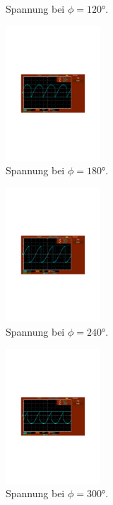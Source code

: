 \begin{figure}
\begin{subfigure}{0.48\textwidth}
      \caption{Spannung bei $\phi = 120°$.}
      \label{fig:ohne_120}
  \end{subfigure}
\hfill 
  \begin{subfigure}{0.48\textwidth}
      \centering
      \includegraphics[height=5cm]{content/abbildungen/ohne/180.pdf}
      \caption{Spannung bei $\phi = 180°$.}
      \label{fig:ohne_180}
  \end{subfigure}
\hfill 
  \begin{subfigure}{0.48\textwidth}
      \centering
      \includegraphics[height=5cm]{content/abbildungen/ohne/240.pdf}
      \caption{Spannung bei $\phi = 240°$.}
      \label{fig:ohne_240}
  \end{subfigure}
\hfill 
  \begin{subfigure}{0.48\textwidth}
      \centering
      \includegraphics[height=5cm]{content/abbildungen/ohne/300.pdf}
      \caption{Spannung bei $\phi = 300°$.}
      \label{fig:ohne_300}
  \end{subfigure}
\hfill 
  \begin{subfigure}{0.48\textwidth}

\end{subfigure}
\end{figure}
